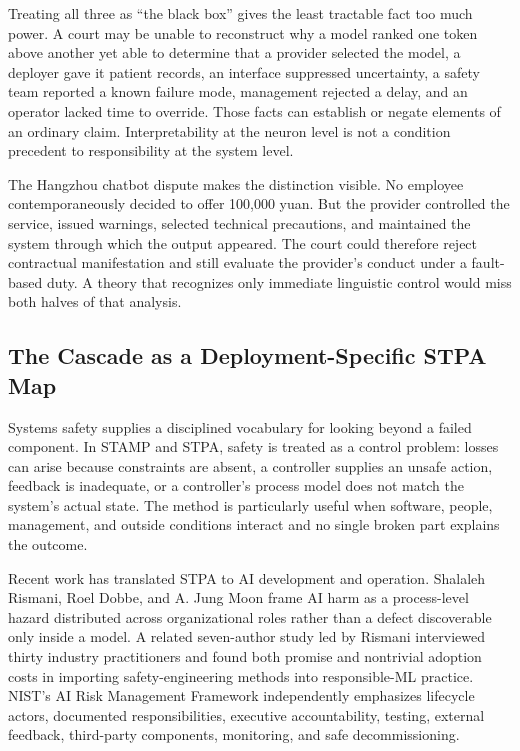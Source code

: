 Treating all three as ``the black box'' gives the least tractable fact too much power. A court may be unable to reconstruct why a model ranked one token above another yet able to determine that a provider selected the model, a deployer gave it patient records, an interface suppressed uncertainty, a safety team reported a known failure mode, management rejected a delay, and an operator lacked time to override. Those facts can establish or negate elements of an ordinary claim. Interpretability at the neuron level is not a condition precedent to responsibility at the system level.

The Hangzhou chatbot dispute makes the distinction visible. No employee contemporaneously decided to offer 100,000 yuan. But the provider controlled the service, issued warnings, selected technical precautions, and maintained the system through which the output appeared. The court could therefore reject contractual manifestation and still evaluate the provider's conduct under a fault-based duty. A theory that recognizes only immediate linguistic control would miss both halves of that analysis.

\subsection{The Cascade as a Deployment-Specific STPA Map}

Systems safety supplies a disciplined vocabulary for looking beyond a failed component. In STAMP and STPA, safety is treated as a control problem: losses can arise because constraints are absent, a controller supplies an unsafe action, feedback is inadequate, or a controller's process model does not match the system's actual state. The method is particularly useful when software, people, management, and outside conditions interact and no single broken part explains the outcome.

Recent work has translated STPA to AI development and operation. Shalaleh Rismani, Roel Dobbe, and A. Jung Moon frame AI harm as a process-level hazard distributed across organizational roles rather than a defect discoverable only inside a model. A related seven-author study led by Rismani interviewed thirty industry practitioners and found both promise and nontrivial adoption costs in importing safety-engineering methods into responsible-ML practice. NIST's AI Risk Management Framework independently emphasizes lifecycle actors, documented responsibilities, executive accountability, testing, external feedback, third-party components, monitoring, and safe decommissioning.

